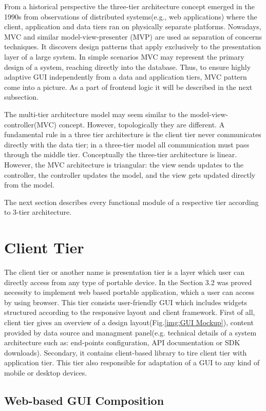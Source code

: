    From a historical perspective the three-tier architecture concept emerged in the 1990s from observations of distributed systems\cite{wiki:3tier}(e.g., web applications) where the client, application and data tiers ran on physically separate platforms. Nowadays, MVC and similar model-view-presenter (MVP) are used as separation of concerns techniques. It discovers design patterns that apply exclusively to the presentation layer of a large system. In simple scenarios MVC may represent the primary design of a system, reaching directly into the database. Thus, to ensure highly adaptive GUI independently from a data and application tiers, MVC pattern come into a picture. As a part of frontend logic it will be described in the next subsection.
  
  The multi-tier architecture model may seem similar to the model-view-controller(MVC) concept. However, topologically they are different. A fundamental rule in a three tier architecture is the client tier never communicates directly with the data tier; in a three-tier model all communication must pass through the middle tier. Conceptually the three-tier architecture is linear. However, the MVC architecture is triangular: the view sends updates to the controller, the controller updates the model, and the view gets updated directly from the model.

  The next section describes every functional module of a respective tier according to 3-tier architecture.

\section{Client Tier}
  The client tier or another name is presentation tier is a layer which user can directly access from any type of portable device. In the Section 3.2 was proved necessity to implement web based portable application, which a user can access by using browser. This tier consists user-friendly GUI which includes widgets structured according to the responsive layout and client framework. First of all, client tier gives an overview of a design layout(Fig.\ref{img:GUI Mockup}), content provided by data source and managment panel(e.g. technical details of a system architecture such as: end-points configuration, API documentation or SDK downloads). Secondary, it contains client-based library to tire client tier with application tier. This tier also responsible for adaptation of a GUI to any kind of mobile or desktop devices. 
  \subsection{Web-based GUI Composition}

